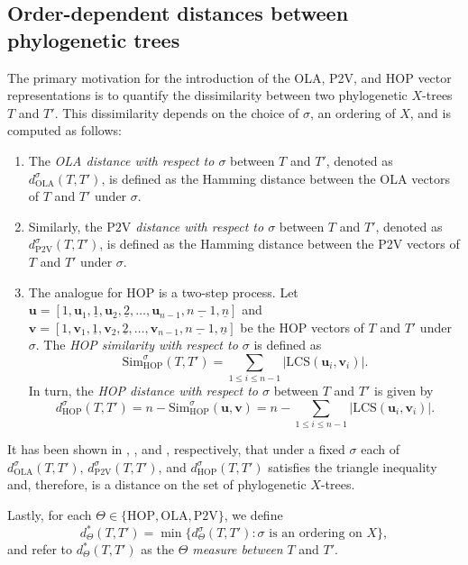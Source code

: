 \documentclass{article}
\newcommand{\HOP}{\mathrm{HOP}}
\newcommand{\OLA}{\mathrm{OLA}}
\newcommand{\PV}{\mathrm{P2V}}
\begin{document}
\subsection{Order-dependent distances between phylogenetic trees}
The primary motivation for the introduction of the OLA, P2V, and HOP vector representations is to quantify the dissimilarity between two phylogenetic $X$-trees $T$ and $T'$. This dissimilarity depends on the choice of $\sigma$, an ordering of $X$, and is computed as follows:
\begin{enumerate}
\item The {\em OLA distance with respect to $\sigma$} between $T$ and $T'$, denoted as $d^\sigma_{\OLA}(T,T')$, is defined as the Hamming distance between the OLA vectors of $T$ and $T'$ under $\sigma$.

\item Similarly, the {\em $\PV$ distance with respect to $\sigma$} between $T$ and $T'$, denoted as $d^\sigma_{\PV}(T,T')$, is defined as the Hamming distance between the P2V vectors of $T$ and $T'$ under $\sigma$.  
    
\item The analogue for HOP is a two-step process. Let $\mathbf{u}=[1,\mathbf{u}_1, \underline{1}, \mathbf{u}_2, \underline{2}, \ldots, \mathbf{u}_{n-1},\underline{n-1},\underline{n}]$ and $\mathbf{v}=[1,\mathbf{v}_1, \underline{1}, \mathbf{v}_2, \underline{2}, \ldots, \mathbf{v}_{n-1},\underline{n-1},\underline{n}]$ be the HOP vectors of $T$ and $T'$ under $\sigma$. The {\em HOP similarity with respect to $\sigma$} is defined as 
    \[ \text{Sim}^\sigma_\HOP(T,T') = \sum\limits_{1 \leq i \leq n-1} \left| \text{LCS}(\mathbf{u}_i,\mathbf{v}_i) \right|.\] 
In turn, the {\em HOP distance with respect to $\sigma$} between $T$ and $T'$ is given by 
    \[ d^\sigma_\HOP(T,T') = n - \text{Sim}^\sigma_\HOP(\textbf{u},\textbf{v}) = n -  \sum\limits_{1 \leq i \leq n-1} \left| \text{LCS}(\mathbf{u}_i,\mathbf{v}_i) \right|.\]
\end{enumerate}
It has been shown in \cite{ola}, \cite{penn2024phylo2vec}, and \cite{hop}, respectively, that under a fixed $\sigma$ each of $d_\OLA^\sigma(T,T')$, $d_\PV^\sigma(T,T')$, and $d_\HOP^\sigma(T,T')$ satisfies the triangle inequality and, therefore, is a distance on the set of phylogenetic $X$-trees. 

Lastly, for each $\Theta\in \{\HOP, \OLA, \PV\}$, we define
$$d^*_{\Theta}(T, T')= \min\big\{d^{\sigma}_{\Theta}(T, T'): \mbox{$\sigma$ is an ordering on $X$}\big\},$$
and refer to $d^*_{\Theta}(T, T')$ as the {\it $\Theta$ measure between} $T$ and $T'$. 
\end{document}
